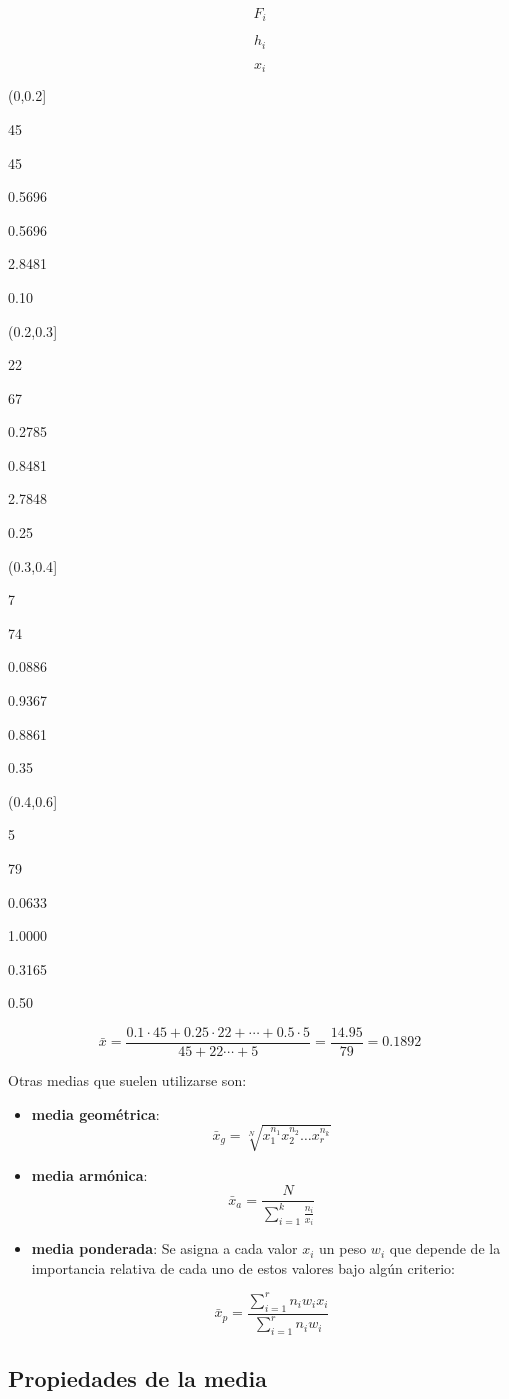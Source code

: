 \documentclass[]{book}
\theoremstyle{definition}
\theoremstyle{definition}
\theoremstyle{definition}
\theoremstyle{remark}
\begin{document}
\[F_i\]

\[h_i\]

\[ x_i \]

(0,0.2{]}

45

45

0.5696

0.5696

2.8481

0.10

(0.2,0.3{]}

22

67

0.2785

0.8481

2.7848

0.25

(0.3,0.4{]}

7

74

0.0886

0.9367

0.8861

0.35

(0.4,0.6{]}

5

79

0.0633

1.0000

0.3165

0.50

\[\bar{x}=\frac{ 0.1 \cdot 45 + 0.25 \cdot 22 + \cdots + 0.5 \cdot 5}{45+22\cdots+5} = \frac{14.95}{79}=0.1892\]

Otras medias que suelen utilizarse son:

\begin{itemize}
\item
  \textbf{media geométrica}:
  \[\bar{x}_g  =  \sqrt[N]{x_1^{n_1} x_2^{n_2} \ldots x_r^{n_k}}\]
\item
  \textbf{media armónica}:
  \[\bar{x}_a  = \frac{N}{\displaystyle\sum_{i=1}^k\frac{n_i}{x_i}}\]
\item
  \textbf{media ponderada}: Se asigna a cada valor \(x_i\) un peso
  \(w_i\) que depende de la importancia relativa de cada uno de estos
  valores bajo algún criterio:

  \[\bar{x}_p = \frac{\sum_{i=1}^r n_iw_ix_i}{\sum_{i=1}^r n_iw_i}\]
\end{itemize}

\subsection{Propiedades de la media}\label{propiedades-de-la-media}
\end{document}
